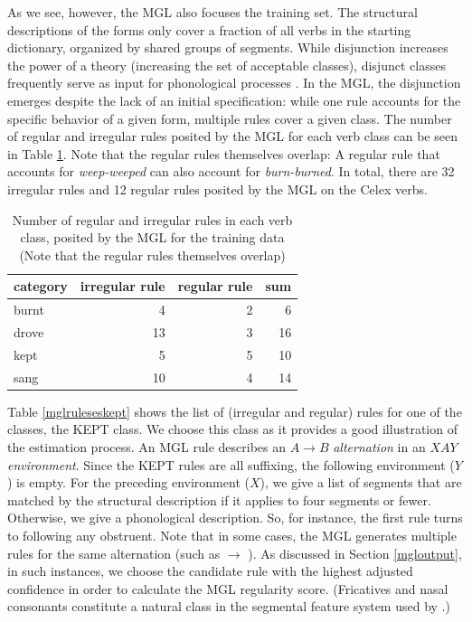 \documentclass[12pt]{article}
\begin{document}
As we see, however, the MGL also focuses the training set. The structural descriptions of the forms only cover a fraction of all verbs in the starting dictionary, organized by shared groups of segments. While disjunction increases the power of a theory (increasing the set of acceptable classes), disjunct classes frequently serve as input for phonological processes \citep{mielke2008emergence}. In the MGL, the disjunction emerges despite the lack of an initial specification: while one rule accounts for the specific behavior of a given form, multiple rules cover a given class. The number of regular and irregular rules posited by the MGL for each verb class can be seen in Table \ref{mglruletable}. Note that the regular rules themselves overlap: A regular rule that accounts for \emph{weep-weeped} can also account for \emph{burn-burned}. In total, there are 32 irregular rules and 12 regular rules posited by the MGL on the {\sc Celex} verbs.


\begin{table}[ht]
\centering
\begin{tabular}{lrrr}
  \hline
category & irregular rule & regular rule & sum \\ 
  \hline
burnt &   4 &   2 &   6 \\ 
  drove &  13 &   3 &  16 \\ 
  kept &   5 &   5 &  10 \\ 
  sang &  10 &   4 &  14 \\ 
   \hline
\end{tabular}
\caption{Number of regular and irregular rules in each verb class, posited by the MGL for the training data (Note that the regular rules themselves overlap)} 
\label{mglruletable}
\end{table}

Table \ref{mglruleseskept} shows the list of (irregular and regular) rules for one of the classes, the KEPT class. We choose this class as it provides a good illustration of the estimation process. An MGL rule describes an $A \rightarrow{} B$ {\em alternation} in an $XAY$ {\em environment}. Since the KEPT rules are all suffixing, the following environment ($Y$) is empty. For the preceding environment ($X$), we give a list of segments that are matched by the structural description if it applies to four segments or fewer. Otherwise, we give a phonological description. So, for instance, the first rule turns \textipa{[il]} to \textipa{[Elt]} following any obstruent. Note that in some cases, the MGL generates multiple rules for the same alternation (such as  $\rightarrow{}$ ). As discussed in Section \ref{mgloutput}, in such instances, we choose the candidate rule with the highest adjusted confidence in order to calculate the MGL regularity score. (Fricatives and nasal consonants constitute a natural class in the segmental feature system used by \citealt{albright2003rules}.) 
\end{document}
